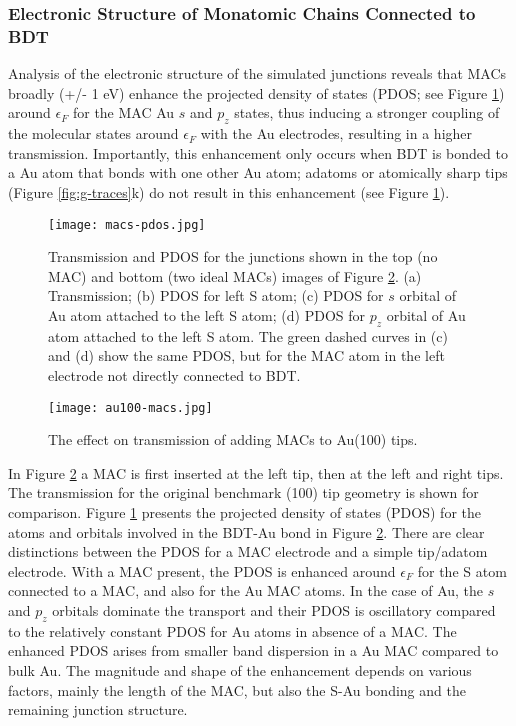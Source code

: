 \documentclass[10pt]{report}  %
\newcommand\findent{\hspace*{\parindent}}
\begin{document}
\subsubsection{Electronic Structure of Monatomic Chains Connected to BDT}

\findent Analysis of the electronic structure of the simulated junctions reveals that MACs broadly (+/- 1 eV) enhance the projected density of states (PDOS; see Figure \ref{fig:macs-pdos}) around $\epsilon_{F}$ for the MAC Au $s$ and $p_{z}$ states, thus inducing a stronger coupling of the molecular states around $\epsilon_{F}$ with the Au electrodes, resulting in a higher transmission. Importantly, this enhancement only occurs when BDT is bonded to a Au atom that bonds with one other Au atom; adatoms or atomically sharp tips (Figure \ref{fig:g-traces}k) do not result in this enhancement (see Figure \ref{fig:macs-pdos}).

\begin{figure}[h!]
	\centering
	\texttt{[image: macs-pdos.jpg]}
	\caption{Transmission and PDOS for the junctions shown in the top (no MAC) and bottom (two ideal MACs) images of Figure \ref{fig:au100-macs}. (a) Transmission; (b) PDOS for left S atom; (c) PDOS for $s$ orbital of Au atom attached to the left S atom; (d) PDOS for $p_{z}$ orbital of Au atom attached to the left S atom. The green dashed curves in (c) and (d) show the same PDOS, but for the MAC atom in the left electrode not directly connected to BDT. }
	\label{fig:macs-pdos}
\end{figure}

\begin{figure}[h!]
	\centering
	\texttt{[image: au100-macs.jpg]}
	\caption{The effect on transmission of adding MACs to Au(100) tips. }
	\label{fig:au100-macs}
\end{figure}

In Figure \ref{fig:au100-macs} a MAC is first inserted at the left tip, then at the left and right tips. The transmission for the original benchmark (100) tip geometry is shown for comparison. Figure \ref{fig:macs-pdos} presents the projected density of states (PDOS) for the atoms and orbitals involved in the BDT-Au bond in Figure \ref{fig:au100-macs}. There are clear distinctions between the PDOS for a MAC electrode and a simple tip/adatom electrode. With a MAC present, the PDOS is enhanced around $\epsilon_{F}$ for the S atom connected to a MAC, and also for the Au MAC atoms. In the case of Au, the $s$ and $p_{z}$ orbitals dominate the transport and their PDOS is oscillatory compared to the relatively constant PDOS for Au atoms in absence of a MAC. The enhanced PDOS arises from smaller band dispersion in a Au MAC compared to bulk Au. The magnitude and shape of the enhancement depends on various factors, mainly the length of the MAC, but also the S-Au bonding and the remaining junction structure.      
\end{document}
